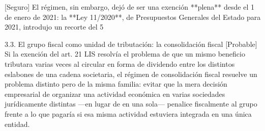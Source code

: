 \documentclass[10pt,a4paper]{article}
\begin{document}
[Seguro] El régimen, sin embargo, dejó de ser una exención **plena** desde el 1 de enero de 2021: la **Ley 11/2020**, de Presupuestos Generales del Estado para 2021, introdujo un recorte del 5%

3.3. El grupo fiscal como unidad de tributación: la consolidación fiscal
[Probable] Si la exención del art. 21 LIS resolvía el problema de que un mismo beneficio tributara varias veces al circular en forma de dividendo entre los distintos eslabones de una cadena societaria, el régimen de consolidación fiscal resuelve un problema distinto pero de la misma familia: evitar que la mera decisión empresarial de organizar una actividad económica en varias sociedades jurídicamente distintas —en lugar de en una sola— penalice fiscalmente al grupo frente a lo que pagaría si esa misma actividad estuviera integrada en una única entidad.
\end{document}
